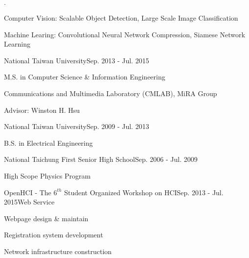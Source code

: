 \documentclass{joel_cv}
\begin{document}
\begin{cvHeader} 
\end{cvHeader}

%
%

\begin{sectionItemize}{$\cdot$}
	\item Computer Vision: Scalable Object Detection, Large Scale Image Classification
	\item Machine Learing: Convolutional Neural Network Compression, Siamese Network Learning
\end{sectionItemize}

%
%

\begin{sectionContentSimple}{National Taiwan University}{Sep. 2013 - Jul. 2015}
	\item M.S. in Computer Science \& Information Engineering
	\item Communications and Multimedia Laboratory (CMLAB), MiRA Group
	\item Advisor: Winston H. Hsu
\end{sectionContentSimple}

\begin{sectionContentSimple}{National Taiwan University}{Sep. 2009 - Jul. 2013}
	\item B.S. in Electrical Engineering
\end{sectionContentSimple}

\begin{sectionContentSimple}{National Taichung First Senior High School}{Sep. 2006 - Jul. 2009}
	\item High Scope Physics Program
\end{sectionContentSimple}

%
%


\begin{sectionContentNormal}{OpenHCI - The $6^{th}$ Student Organized Workshop on HCI}{Sep. 2013 - Jul. 2015}{Web Service}
	\item Webpage design \& maintain
	\item Registration system development
	\item Network infrastructure construction
\end{sectionContentNormal}
\end{document}

